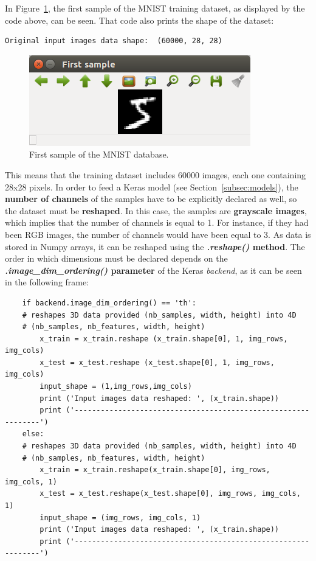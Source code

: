 In Figure~\ref{fig:firstsample}, the first sample of the MNIST training dataset, as displayed by the code above, can be seen. That code also prints the shape of the dataset:
\begin{Verbatim}[frame=single]
Original input images data shape:  (60000, 28, 28)
\end{Verbatim}

\begin{figure}
	\centering
	\includegraphics[width=0.7\linewidth, keepaspectratio]{figures/first_sample.png}
	\caption{First sample of the MNIST database.}
	\label{fig:firstsample}
\end{figure}

This means that the training dataset includes 60000 images, each one containing 28x28 pixels. In order to feed a Keras model (see Section~\ref{subsec:models}), the \textbf{number of channels} of the samples have to be explicitly declared as well, so the dataset must be \textbf{reshaped}. In this case, the samples are \textbf{grayscale images}, which implies that the number of channels is equal to 1. For instance, if they had been RGB images, the number of channels would have been equal to 3. As data is stored in Numpy arrays, it can be reshaped using the \textbf{\textit{.reshape()} method}. The order in which dimensions must be declared depends on the \textbf{\textit{.image\_dim\_ordering()} parameter} of the Keras \textit{backend}, as it can be seen in the following frame:
\begin{lstlisting}
    if backend.image_dim_ordering() == 'th':
    # reshapes 3D data provided (nb_samples, width, height) into 4D
    # (nb_samples, nb_features, width, height) 
	    x_train = x_train.reshape (x_train.shape[0], 1, img_rows, img_cols)
	    x_test = x_test.reshape (x_test.shape[0], 1, img_rows, img_cols)
	    input_shape = (1,img_rows,img_cols)
	    print ('Input images data reshaped: ', (x_train.shape))
	    print ('--------------------------------------------------------------')
    else:
    # reshapes 3D data provided (nb_samples, width, height) into 4D
    # (nb_samples, nb_features, width, height) 
	    x_train = x_train.reshape(x_train.shape[0], img_rows, img_cols, 1)
	    x_test = x_test.reshape(x_test.shape[0], img_rows, img_cols, 1)
	    input_shape = (img_rows, img_cols, 1)
	    print ('Input images data reshaped: ', (x_train.shape))
	    print ('--------------------------------------------------------------')
\end{lstlisting}
 

